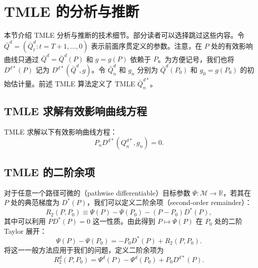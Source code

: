 \section{TMLE 的分析与推断}
\label{sec:ch04-analysis-inference}

本节介绍 TMLE 分析与推断的技术细节。部分读者可以选择跳过这些内容。令 $\bar Q^d=(\bar Q_t^d:t=T+1,\ldots,0)$ 表示前面序贯定义的参数。注意，在 $P$ 处的有效影响曲线只通过 $\bar Q^d=\bar Q^d(P)$ 和 $g=g(P)$ 依赖于 $P$。为方便记号，我们也将 $D^{d*}(P)$ 记为 $D^{d*}(\bar Q^d,g)$。令 $\bar Q_n^d$ 和 $g_n$ 分别为 $\bar Q^d(P_0)$ 和 $g_0=g(P_0)$ 的初始估计量。前述 TMLE 算法定义了 TMLE $\bar Q_n^{d*}$。

\subsection{TMLE 求解有效影响曲线方程}
\label{subsec:ch04-eic-equation}

TMLE 求解以下有效影响曲线方程：
\[
 P_nD^{d*}(Q_n^{d*},g_n)=0.
\]

\subsection{TMLE 的二阶余项}
\label{subsec:ch04-second-order}

对于任意一个路径可微的（pathwise differentiable）目标参数 $\Psi:\mathcal M\to\mathbb R$，若其在 $P$ 处的典范梯度为 $D^*(P)$，我们可以定义二阶余项（second-order remainder）：
\[
 R_2(P,P_0)\equiv\Psi(P)-\Psi(P_0)-(P-P_0)D^*(P),
\]
其中可以利用 $PD^*(P)=0$ 这一性质。由此得到 $P\mapsto\Psi(P)$ 在 $P_0$ 处的二阶 Taylor 展开：
\[
 \Psi(P)-\Psi(P_0)=-P_0D^*(P)+R_2(P,P_0).
\]
将这一一般方法应用于我们的问题，定义二阶余项为
\[
 R_2^d(P,P_0)=\Psi^d(P)-\Psi^d(P_0)+P_0D^{d*}(P).
\]

